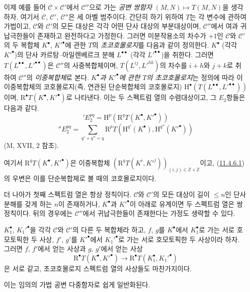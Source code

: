\begin{env}[11.4.6]
\label{0.11.4.6-fr}
이제 예를 들어 $\mathcal C\times\mathcal C'$에서 $\mathcal C''$으로
가는 \emph{공변 쌍함자} $(M,N)\mapsto T(M,N)$을 생각하자. 여기서
$\mathcal C$, $\mathcal C'$, $\mathcal C''$은 세 아벨 범주이다. 간단히
하기 위하여 $T$는 각 변수에 관하여 가법이고, $\mathcal C$와
$\mathcal C'$의 모든 대상은 각각 어떤 단사 대상의 부분대상이며,
$\mathcal C''$에서 여과 귀납극한들이 존재하고 완전하다고 가정한다.
그러면 미분작용소의 차수가 $+1$인 $\mathcal C$와 $\mathcal C'$의 두
복합체 $K^\bullet$, $K'^\bullet$에 관한 $T$의 \emph{초코호몰로지}를
다음과 같이 정의한다. $K^\bullet$ (각각 $K'^\bullet$)의 단사
카르탕--아일렌베르크 분해 $L^{\bullet\bullet}$ (각각
$L'^{\bullet\bullet}$)을 취한다. 그러면
$T(L^{\bullet\bullet},L'^{\bullet\bullet})$은 $\mathcal C''$의
사중복합체이며, $T(L^{ij},L'^{hk})$의 차수를 $i+h$와 $j+k$로 취하여
$\mathcal C''$의 \emph{이중복합체}로 본다. \emph{$K^\bullet$과
$K'^\bullet$에 관한 $T$의 초코호몰로지}는 정의에 따라 이
이중복합체의 코호몰로지(즉, 연관된 단순복합체의 코호몰로지)
$\mathrm H^\bullet(T(L^{\bullet\bullet},L'^{\bullet\bullet}))$이며,
$\mathrm R^\bullet T(K^\bullet,K'^\bullet)$로 나타낸다. 이는 두
스펙트럼 열의 수렴대상이고, 그 $E_2$항들은 다음과 같다.
\[
  \label{0.11.4.6.1-fr}
  'E_2^{pq}=\mathrm H^p(\mathrm R^qT(K^\bullet,K'^\bullet))
  \tag{11.4.6.1}
\]
\[
  \label{0.11.4.6.2-fr}
  ''E_2^{pq}=\sum_{q'+q''=q}
  \mathrm R^pT(\mathrm H^{q'}(K^\bullet),\mathrm H^{q''}(K'^\bullet))
  \tag{11.4.6.2}
\]
(M, XVII, 2 참조).

여기서 $\mathrm R^qT(K^\bullet,K'^\bullet)$은 이중복합체
$(\mathrm R^qT(K^i,K'^j))_{(i,j)\in\mathbb Z\times\mathbb Z}$이고,
(\hyperref[0.11.4.6.1-fr]{11.4.6.1})의 우변은 이를 단순복합체로 볼 때의
코호몰로지이다.

더 나아가 첫째 스펙트럼 열은 항상 정칙이다. $\mathcal C$와
$\mathcal C'$의 모든 대상이 길이 $\leq n$인 단사 분해를 갖게 하는
$n$이 존재하거나, $K^\bullet$과 $K'^\bullet$이 아래로 유계이면 두
스펙트럼 열은 쌍정칙이다. 뒤의 경우에는 $\mathcal C''$에서
귀납극한들이 존재한다는 가정도 생략할 수 있다.

$K_1^\bullet$, $K_1'^\bullet$을 각각 $\mathcal C$와 $\mathcal C'$의
다른 두 복합체라 하고, $f$, $g$를 $K^\bullet$에서 $K_1^\bullet$로
가는 서로 호모토픽한 두 사상, $f'$, $g'$를 $K'^\bullet$에서
$K_1'^\bullet$로 가는 서로 호모토픽한 두 사상이라 하자. 그러면
$f$, $f'$에서 얻는 사상과 $g$, $g'$에서 얻는 사상
\[
\mathrm R^\bullet T(K^\bullet,K'^\bullet)\to
\mathrm R^\bullet T(K_1^\bullet,K_1'^\bullet)
\]
은 서로 같고, 초코호몰로지 스펙트럼 열의 사상들도 마찬가지이다.

이는 임의의 가법 공변 다중함자로 쉽게 일반화된다.
\end{env}

